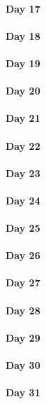\documentclass[UTF8,a4paper,8pt]{ctexart}
\begin{document}
 	 \paragraph{Day 17      \quad     }
 	 \paragraph{Day 18      \quad     }
 	 \paragraph{Day 19      \quad     }
 	 \paragraph{Day 20      \quad     }
 	 \paragraph{Day 21      \quad     }
 	 \paragraph{Day 22      \quad     }
 	 \paragraph{Day 23      \quad     }
 	 \paragraph{Day 24      \quad     }
 	 \paragraph{Day 25      \quad     }
 	 \paragraph{Day 26      \quad     }
 	 \paragraph{Day 27      \quad     }
 	 \paragraph{Day 28      \quad     }
 	 \paragraph{Day 29      \quad     }   
 	 \paragraph{Day 30      \quad     }
 	 \paragraph{Day 31      \quad     }
	
	
\end{document}
